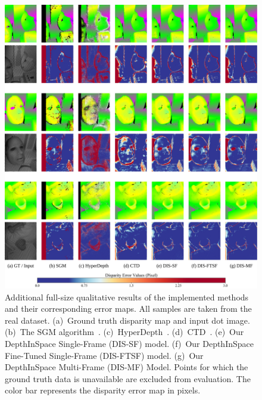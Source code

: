 \begin{figure}
    \begin{center}
        \includegraphics[width=1\linewidth]{images/chapter2/supp_figures/supp_results_4.jpg}
    \end{center}
   \caption{Additional full-size qualitative results of the implemented methods and their corresponding error maps. All samples are taken from the real dataset. (a)~Ground truth disparity map and input dot image. (b)~The SGM algorithm~\citep{hirschmuller2007stereo}. (c)~HyperDepth~\citep{ryan2016hyperdepth}. (d)~CTD~\citep{riegler2019connecting}. (e)~Our DepthInSpace Single-Frame (DIS-SF) model. (f)~Our DepthInSpace Fine-Tuned Single-Frame (DIS-FTSF) model. (g)~Our DepthInSpace Multi-Frame (DIS-MF) Model. Points for which the ground truth data is unavailable are excluded from evaluation. The color bar represents the disparity error map in pixels.}
    \label{fig:c2_real_results}
\end{figure}

